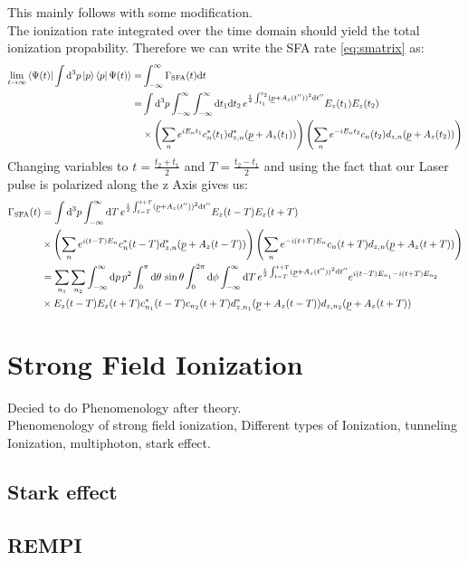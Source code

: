This mainly follows \cite{Theory_NPS} with some modification.\\
The ionization rate integrated over the time domain should yield the total ionization propability.
Therefore we can write the SFA rate \eqref{eq:smatrix} as:
\begin{align*}
    \lim_{t\to\infty}\braket{\Psi(t)|\int \dd^3 p \ket{p}\bra{p}\Psi(t)} = &\int_{-\infty}^{\infty} \Gamma_{\mathrm{SFA}}(t) \dd t \\ %
    = &\int \dd^3 p \int_{-\infty}^{\infty} \int_{-\infty}^{\infty} \dd t_1  \dd t_2 \, e^{\frac{i}{2}\int_{t_1}^{t_2}(\uvec{p}+A_z(t''))^2\dd t''} E_z(t_1)E_z(t_2)\\
    &\times\left(\sum_{n}e^{iE_nt_1}c_n^*(t_1)d_{z,n}^*(\uvec{p}+A_z(t_1))\right)\left(\sum_{n}e^{-iE_nt_2}c_n(t_2)d_{z,n}(\uvec{p}+A_z(t_2))\right)
\end{align*}
Changing variables to $t=\frac{t_2+t_1}{2}$ and $T=\frac{t_2-t_1}{2}$ and using the fact that our Laser pulse is polarized along the z Axis gives us:
\begin{align*}
    \Gamma_{\mathrm{SFA}}(t) &= \int \mathrm{d}^3 p \int_{-\infty}^{\infty} \mathrm{d} T \, e^{\frac{i}{2}\int_{t-T}^{t+T}(\underline{p}+A_z(t''))^2\mathrm{d} t''} E_z(t-T) E_z(t+T)\\
    &\times\left(\sum_{n}e^{i(t-T)E_n}c_n^*(t-T)d_{z,n}^*(\underline{p}+A_z(t-T))\right)\left(\sum_{n}e^{-i(t+T)E_n}c_n(t+T)d_{z,n}(\underline{p}+A_z(t+T))\right)\\
    &= \sum_{n_1}\sum_{n_2} \int_{-\infty}^{\infty} \mathrm{d} p\,p^2\int_0^{\pi} \mathrm{d}\theta\,\sin\theta \int_0^{2\pi}\mathrm{d} \phi\int_{-\infty}^{\infty} \mathrm{d} T \, e^{\frac{i}{2}\int_{t-T}^{t+T}(\underline{p}+A_z(t''))^2\mathrm{d} t''} e^{i(t-T)E_{n_1}-i(t+T)E_{n_2}}\\
    &\times E_z(t-T) E_z(t+T)c_{n_1}^*(t-T)c_{n_2}(t+T) d_{z,n_1}^*(\underline{p}+A_z(t-T))d_{z,n_2}(\underline{p}+A_z(t+T))
\end{align*}






\newpage
\section{Strong Field Ionization}
Decied to do Phenomenology after theory.\\
Phenomenology of strong field ionization, Different types of Ionization, tunneling Ionization, multiphoton, stark effect.
\subsection{Stark effect}
\subsection{REMPI}